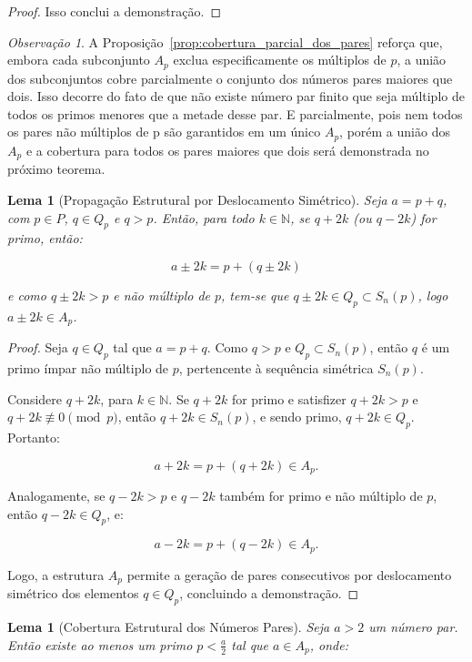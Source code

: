 \documentclass[a4paper,11pt]{article}
\newtheorem{lemma}[theorem]{Lema}
\theoremstyle{definition}
\theoremstyle{remark}
\newtheorem{remark}[theorem]{Observação}
\begin{document}
\begin{otherlanguage}{brazil}
\begin{proof}
		Isso conclui a demonstração.
	\end{proof}
	\begin{remark}
		A Proposição~\ref{prop:cobertura_parcial_dos_pares} reforça que, embora cada subconjunto \(A_p\) exclua especificamente os múltiplos de \(p\), a união dos subconjuntos cobre parcialmente o conjunto dos números pares maiores que dois. Isso decorre do fato de que não existe número par finito que seja múltiplo de todos os primos menores que a metade desse par. E parcialmente, pois nem todos os pares não múltiplos de p são garantidos em um único \(A_p\), porém a união dos \(A_p\) e a cobertura para todos os pares maiores que dois será demonstrada no próximo teorema.
	\end{remark}
	
	\begin{lemma}[Propagação Estrutural por Deslocamento Simétrico]
		Seja \(a = p + q\), com \(p \in P\), \(q \in Q_p\) e \(q > p\). Então, para todo \(k \in \mathbb{N}\), se \(q + 2k\) (ou \(q - 2k\)) for primo, então:
		
		\[
		a \pm 2k = p + (q \pm 2k)
		\]
		
		e como \(q \pm 2k > p\) e não múltiplo de \(p\), tem-se que \(q \pm 2k \in Q_p \subset S_n(p)\), logo \(a \pm 2k \in A_p\).
	\end{lemma}
	
	\begin{proof}
		Seja \(q \in Q_p\) tal que \(a = p + q\). Como \(q > p\) e \(Q_p \subset S_n(p)\), então \(q\) é um primo ímpar não múltiplo de \(p\), pertencente à sequência simétrica \(S_n(p)\).
		
		Considere \(q + 2k\), para \(k \in \mathbb{N}\). Se \(q + 2k\) for primo e satisfizer \(q + 2k > p\) e \(q + 2k \not\equiv 0 \pmod{p}\), então \(q + 2k \in S_n(p)\), e sendo primo, \(q + 2k \in Q_p\). Portanto:
		
		\[
		a + 2k = p + (q + 2k) \in A_p.
		\]
		
		Analogamente, se \(q - 2k > p\) e \(q - 2k\) também for primo e não múltiplo de \(p\), então \(q - 2k \in Q_p\), e:
		
		\[
		a - 2k = p + (q - 2k) \in A_p.
		\]
		
		Logo, a estrutura \(A_p\) permite a geração de pares consecutivos por deslocamento simétrico dos elementos \(q \in Q_p\), concluindo a demonstração.
	\end{proof}
	
	\begin{lemma}[Cobertura Estrutural dos Números Pares]\label{lema:cobertura_dos_pares}
		Seja \(a > 2\) um número par. Então existe ao menos um primo \(p < \frac{a}{2}\) tal que \(a \in A_p\), onde:
		

\end{lemma}
\end{otherlanguage}
\end{document}
